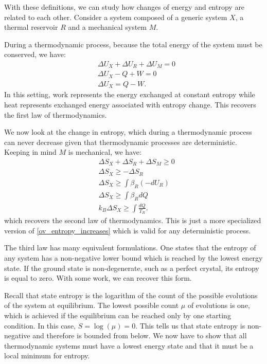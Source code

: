 \documentclass[letterpaper,twocolumn]{article}
\begin{document}
With these definitions, we can study how changes of energy and entropy are related to each other. Consider a system composed of a generic system $X$, a thermal reservoir $R$ and a mechanical system $M$.

During a thermodynamic process, because the total energy of the system must be conserved, we have:
\begin{equation}
\begin{aligned}
&\Delta U_X + \Delta U_R + \Delta U_M = 0 \\
&\Delta U_X - Q + W = 0 \\
&\Delta U_X = Q - W.
\end{aligned}
\end{equation}
In this setting, work represents the energy exchanged at constant entropy while heat represents exchanged energy associated with entropy change. This recovers the first law of thermodynamics.

We now look at the change in entropy, which during a thermodynamic process can never decrease given that thermodynamic processes are deterministic. Keeping in mind $M$ is mechanical, we have:
\begin{equation}
\begin{aligned}
&\Delta S_X + \Delta S_R + \Delta S_M \geq 0 \\
&\Delta S_X \geq - \Delta S_R \\
&\Delta S_X \geq \int \beta_R (- dU_R) \\
&\Delta S_X \geq \int \beta_R d Q \\
&k_B \Delta S_X \geq \int \frac{d Q}{T_R}.
\end{aligned}
\end{equation}
which recovers the second law of thermodynamics. This is just a more specialized version of \eqref{ov_entropy_increases} which is valid for any deterministic process.

The third law has many equivalent formulations. %
One states that the entropy of any system has a non-negative lower bound which is reached by the lowest energy state. If the ground state is non-degenerate, such as a perfect crystal, its entropy is equal to zero. With some work, we can recover this form.

Recall that state entropy is the logarithm of the count of the possible evolutions of the system at equilibrium. The lowest possible count $\mu$ of evolutions is one, which is achieved if the equilibrium can be reached only by one starting condition. In this case, $S=\log(\mu)=0$. This tells us that state entropy is non-negative and therefore is bounded from below. We now have to show that all thermodynamic systems must have a lowest energy state and that it must be a local minimum for entropy.
\end{document}
